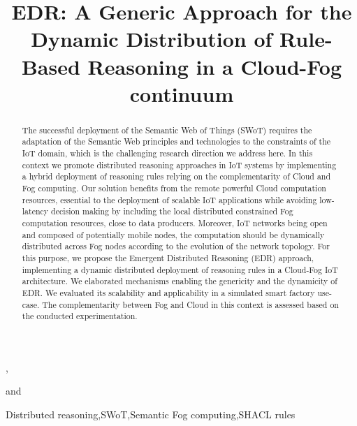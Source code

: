 \documentclass{iosart2c}
\begin{document}
\begin{frontmatter}                           
	
\title{EDR: A Generic Approach for the Dynamic Distribution of Rule-Based Reasoning in a Cloud-Fog continuum}



\author[A,B]{ },
\author[B]{ }
\author[A]{ }
and
\author[B]{ }
\address[A]{IRIT,\\Maison de la Recherche, Univ. Toulouse Jean Jaurès,\\5 allées Antonio Machado, F-31000 Toulouse\\email: \{name.surname\}@irit.fr}
\address[B]{LAAS-CNRS,\\ Université de Toulouse, CNRS, INSA, Toulouse, France\\email: \{name.surname\}@laas.fr}



\begin{abstract}
The successful deployment of the Semantic Web of Things (SWoT) requires the adaptation of the Semantic Web principles and technologies to the constraints of the IoT domain, which is the challenging research direction we address here. 
In this context we promote distributed reasoning approaches in IoT systems by implementing a hybrid deployment of reasoning rules relying on the complementarity of Cloud and Fog computing.  
Our solution benefits from the remote powerful Cloud computation resources, essential to the deployment of scalable IoT applications while avoiding low-latency decision making by including the local distributed constrained Fog computation resources, close to data producers.
Moreover, IoT networks being open and composed of potentially mobile nodes, the computation should be dynamically distributed across Fog nodes according to the evolution of the network topology.
For this purpose, we propose the Emergent Distributed Reasoning (EDR) approach, implementing a dynamic distributed deployment of reasoning rules in a Cloud-Fog IoT architecture.
We elaborated mechanisms enabling the genericity and the dynamicity of EDR.
We evaluated its scalability and applicability in a simulated smart factory use-case.
The complementarity between Fog and Cloud in this context is assessed based on the conducted experimentation.
\end{abstract}

\begin{keyword}
	Distributed reasoning\sep SWoT\sep Semantic Fog computing\sep SHACL rules
\end{keyword}
	
\end{frontmatter}
\end{document}
